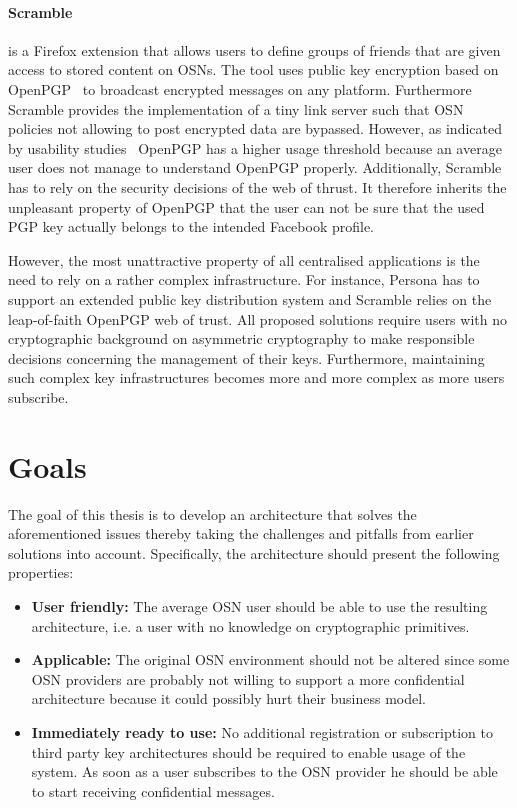\paragraph{Scramble~\cite{art:BeatoKW11}} is a Firefox extension that allows users to define groups of friends that are given access to stored content on OSNs. The tool uses public key encryption based on OpenPGP~\cite{rfc4880} to broadcast encrypted messages on any platform. Furthermore Scramble provides the implementation of a tiny link server such that OSN policies not allowing to post encrypted data are bypassed. However, as indicated by usability studies~\cite{art:WhittenT99} OpenPGP has a higher usage threshold because an average user does not manage to understand OpenPGP properly. Additionally, Scramble has to rely on the security decisions of the web of thrust. It therefore inherits the unpleasant property of OpenPGP that the user can not be sure that the used PGP key actually belongs to the intended Facebook profile.

However, the most unattractive property of all centralised applications is the need to rely on a rather complex infrastructure. For instance, Persona has to support an extended public key distribution system and Scramble relies on the leap-of-faith OpenPGP web of trust. All proposed solutions require users with no cryptographic background on asymmetric cryptography to make responsible decisions concerning the management of their keys. Furthermore, maintaining such complex key infrastructures becomes more and more complex as more users subscribe.

\section{Goals}
\label{sec:goals_of_this_thesis}
The goal of this thesis is to develop an architecture that solves the aforementioned issues thereby taking the challenges and pitfalls from earlier solutions into account. Specifically, the architecture should present the following properties:
\begin{itemize}
 \item \textbf{User friendly:} The average OSN user should be able to use the resulting architecture, i.e. a user with no knowledge on cryptographic primitives.
 \item \textbf{Applicable:} The original OSN environment should not be altered since some OSN providers are probably not willing to support a more confidential architecture because it could possibly hurt their business model.
 \item \textbf{Immediately ready to use:} No additional registration or subscription to third party key architectures should be required to enable usage of the system. As soon as a user subscribes to the OSN provider he should be able to start receiving confidential messages.
\end{itemize}

